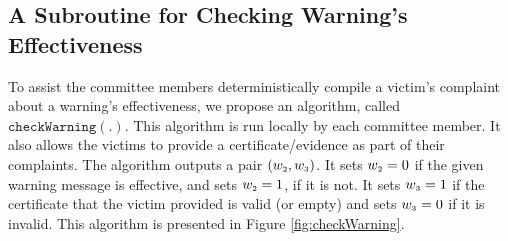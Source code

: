 

\vspace{-4mm}
\subsection{A Subroutine for Checking Warning's Effectiveness}



To assist the committee members deterministically  compile a victim's  complaint about a warning's  effectiveness, we propose an algorithm,  called $\mathtt{checkWarning}(.)$.  This algorithm is run locally by each committee member. It also allows the victims to provide a certificate/evidence as part of their complaints.   The algorithm outputs a pair $(w_{\scriptscriptstyle 2}, w_{\scriptscriptstyle 3})$. It  sets $w_{\scriptscriptstyle 2}=0$  if the given warning message is effective, and sets $w_{\scriptscriptstyle 2}=1$, if it is not. It sets $w_{\scriptscriptstyle 3}=1$ if the certificate that the victim provided is valid (or empty) and sets $w_{\scriptscriptstyle 3}=0$ if it is invalid.  This algorithm is presented in Figure \ref{fig:checkWarning}.




